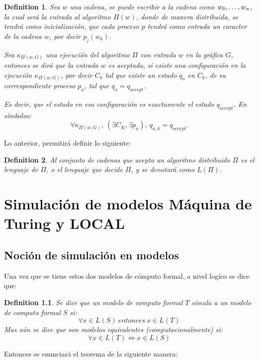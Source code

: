 \documentclass[10pt]{report}
\newtheorem{definition}{Definition}
\begin{document}
    \theoremstyle{definition}
    \begin{definition}
        Sea $w$ una cadena, se puede escribir a la cadena como $w_{0},\mathellipsis, w_{n}$, la cual será la entrada al algoritmo
        $\Pi(w)$, donde de manera distribuida, se tendrá como inicialización, que cada proceso $p$ tendrá como entrada un caracter de la cadena $w$, por decir $p_{j}(w_{k})$.\newline

        Sea $\kappa_{\Pi(w,G)}$ una ejecución del algoritmo $\Pi$ con entrada $w$ en la gráfica $G$, entonces se dirá que
        la entrada $w$ es aceptada, si existe una configuración en la ejecución $\kappa_{\Pi(w,G)}$, por decir $C_{k}$ tal que
        existe un estado $q_{a}$ en $C_{k}$, de su correspondiente proceso $p_{a}$, tal que $q_{a}=q_{accept}$.\newline

        Es decir, que el estado en esa configuración es exactamente el estado $q_{accept}$.\newline
        En símbolos:
        \begin{equation}
            \forall \kappa_{\Pi(w,G)},\ (\exists C_{K},\exists p_{a}),\ q_{a,k}=q_{accept}.\label{eq:equation4}
        \end{equation}
    \end{definition}

    Lo anterior, permitirá definir lo siguiente:
    \begin{definition}
        Al conjunto de cadenas que acepta un algoritmo distribuido $\Pi$ es el lenguaje
        de $\Pi$, o el lenguaje que decide $\Pi$, y se denotará como $L(\Pi)$.
    \end{definition}


    \chapter{Simulación de modelos Máquina de Turing y \textbf{LOCAL}}
    \section{Noción de simulación en modelos}\label{sec:nocion-de-simulación-en-modelos}
    Una vez que se tiene estos dos modelos de cómputo formal, a nivel logíco se dice que:
    \theoremstyle{definition}
    \begin{definition}
        Se dice que un modelo de computo formal $T$ simula a un modelo de computo formal  $S$ si:
        \begin{equation}
        \forall x\in L(S) \ entonces \ x\in L(T)\label{eq:equation13}
        \end{equation}
        Mas aún se dice que son modelos equivalentes (computacionalmente) si:
        \begin{equation}
        \forall x\in L(T) \iff x\in L(S) \label{eq:equation14}
        \end{equation}
    \end{definition}
    \space
    Entonces se enunciará el teorema de la siguiente manera:
\end{document}
